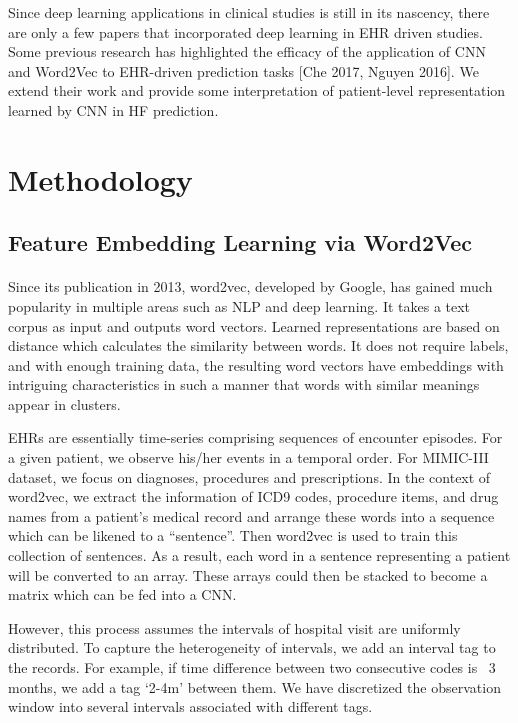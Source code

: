 \documentclass[11pt]{article}
\begin{document}
	Since deep learning applications in clinical studies is still in its nascency, there are only a few papers that incorporated deep learning in EHR driven studies. Some previous research has highlighted the efficacy of the application of CNN and Word2Vec to EHR-driven prediction tasks [Che 2017, Nguyen 2016]. We extend their work and provide some interpretation of patient-level representation learned by CNN in HF prediction.
	
	
	\section{Methodology}
	\label{sec:method}
	
	\subsection{Feature Embedding Learning via Word2Vec}
	
	\paragraph{}Since its publication in 2013, word2vec, developed by Google, has gained much popularity in multiple areas such as NLP and deep learning. It takes a text corpus as input and outputs word vectors. Learned representations are based on distance which calculates the similarity between words. It does not require labels, and with enough training data, the resulting word vectors have embeddings with intriguing characteristics in such a manner that words with similar meanings appear in clusters.
	
	EHRs are essentially time-series comprising sequences of encounter episodes. For a given patient, we observe his/her events in a temporal order. For MIMIC-III dataset, we focus on diagnoses, procedures and prescriptions. In the context of word2vec, we extract the information of ICD9 codes, procedure items, and drug names from a patient’s medical record and arrange these words into a sequence which can be likened to a “sentence”. Then word2vec is used to train this collection of sentences. As a result, each word in a sentence representing a patient will be converted to an array. These arrays could then be stacked to become a matrix which can be fed into a CNN.
	
	However, this process assumes the intervals of hospital visit are uniformly distributed. To capture the heterogeneity of intervals, we add an interval tag to the records. For example, if time difference between two consecutive codes is ~3 months, we add a tag ‘2-4m’ between them. We have discretized the observation window into several intervals associated with different tags. 
	
\end{document}
